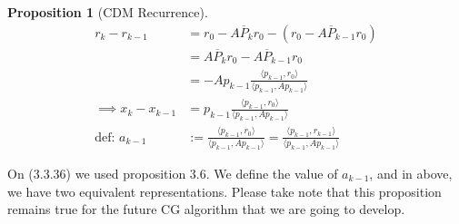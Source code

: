 \documentclass[]{article}
\theoremstyle{definition}
\newtheorem{prop}{Proposition}[section]  %
\begin{document}
            \begin{prop}[CDM Recurrence]\label{prop:CDM_Recurrence}
                \begin{align}
                    r_k - r_{k - 1} &= r_0 - A\overline{P}_kr_0 - (r_0 - A\overline{P}_{k - 1}r_0)
                    \\
                    &= A\overline{P}_kr_0 - A\overline{P}_{k - 1}r_0
                    \\
                    &= - Ap_{k - 1}\frac{\langle p_{k - 1}, r_0\rangle}{\langle p_{k - 1}, Ap_{k - 1}\rangle}
                    \\
                    \implies 
                    x_{k} - x_{k - 1} &= 
                    p_{k - 1}\frac{\langle p_{k - 1}, r_0\rangle}{\langle p_{k - 1}, Ap_{k - 1}\rangle}
                    \\
                    \text{def: } a_{k - 1} &:= \frac{\langle p_{k - 1}, r_0\rangle}{
                        \langle p_{k - 1}, Ap_{k - 1}\rangle
                    } = 
                    \frac{\langle p_{k - 1}, r_{k - 1}\rangle}{
                        \langle p_{k - 1}, Ap_{k - 1}\rangle
                    }
            \end{align}
            \end{prop}
            On (3.3.36) we used proposition 3.6. We define the value of $a_{k - 1}$, and in above, we have two equivalent representations. Please take note that this proposition remains true for the future CG algorithm that we are going to develop. 
\end{document}
